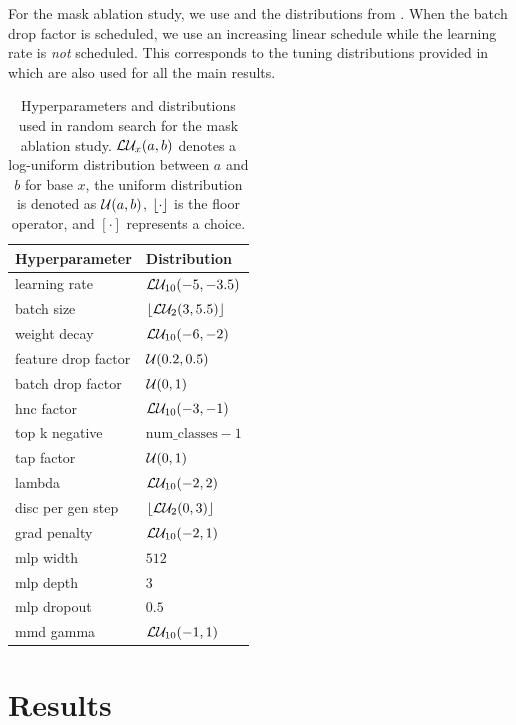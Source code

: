 For the mask ablation study, we use \adam \cite{Kingma2015} and the distributions from . When the batch drop factor is scheduled, we use an increasing linear schedule while the learning rate is \emph{not} scheduled. This corresponds to the tuning distributions provided in \domainbed which are also used for all the main results.
\begin{table}[!htbp]
\small
    \centering
    \begin{tabular}{ll}
        \toprule
        \textbf{Hyperparameter} & \textbf{Distribution} \\
        \midrule
        learning rate & $\mathcal{L}\mathcal{U}_{10}(-5, -3.5)$ \\
        batch size  & $\lfloor\mathcal{L}\mathcal{U}_{2}(3, 5.5)\rfloor$ \\
        weight decay  & $\mathcal{L}\mathcal{U}_{10}(-6, -2)$ \\
        feature drop factor  & $\mathcal{U}(0.2, 0.5)$ \\
        batch drop factor  & $\mathcal{U}(0, 1)$ \\
        hnc factor & $\mathcal{L}\mathcal{U}_{10}(-3, -1)$ \\
        top k negative & $\mathrm{num\_classes} - 1$ \\
        tap factor & $\mathcal{U}(0, 1)$ \\
        lambda & $\mathcal{L}\mathcal{U}_{10}(-2, 2)$ \\
        disc per gen step & $\lfloor\mathcal{L}\mathcal{U}_{2}(0, 3)\rfloor$ \\
        grad penalty & $\mathcal{L}\mathcal{U}_{10}(-2, 1)$ \\
        mlp width & $512$ \\
        mlp depth & $3$ \\
        mlp dropout & $0.5$ \\
        mmd gamma & $\mathcal{L}\mathcal{U}_{10}(-1, 1)$ \\
        \bottomrule 
    \end{tabular}
    \caption[Hyperparameters and distributions used for the mask ablation study]{Hyperparameters and distributions used in random search for the mask ablation study. $\mathcal{L}\mathcal{U}_{x}(a, b)$ denotes a log-uniform distribution between $a$ and $b$ for base $x$, the uniform distribution is denoted as $\mathcal{U}(a, b)$, $\lfloor\cdot\rfloor$ is the floor operator, and $[\cdot]$ represents a choice.}
    \label{tab:abl-distributions-mask}
\end{table}

\section{Results}


